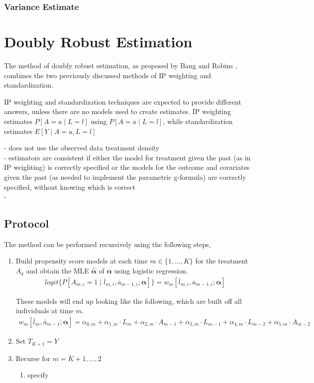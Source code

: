 \subsubsection{Variance Estimate} 




\section{Doubly Robust Estimation} 
The method of doubly robust estimation, as proposed by Bang and Robins \cite{bang2005doubly}, combines the two previously discussed methods of IP weighting and standardization.  

IP weighting and standardization techniques are expected to provide different answers, unless there are no models used to create estimates.\cite{hernan_robins_2016}  
IP weighting estimates $P[A=a \mid L =l]$ using $P[A =a \mid L= l]$, while standardization estimates $E[Y \mid A = a, L=l]$  

- does not use the observed data treatment density \\
- estimators are consistent if either the model for treatment given the past (as in IP weighting) is correctly specified or the models for the outcome and covariates given the past (as needed to implement the parametric g-formula) are correctly specified, without knowing which is correct\\
- 

\subsection{Protocol} 
The method can be performed recursively using the following steps, 

\begin{enumerate}
\item Build propensity score models at each time $m \in \{1, \dots, K \}$ for the treatment $A_k$ and obtain the MLE $\hat{\mathbf{\alpha}}$ of $\mathbf{\alpha}$ using logistic regression. 
\begin{align} 
logit\{P[A_{m,i} = 1 \mid \overline{l}_{m,i}, \overline{a}_{m-1,i}; \mathbf{\alpha}]\} = w_m [\overline{l}_{m,i}, \overline{a}_{m-1,i}; \mathbf{\alpha}]
\end{align} 

These models will end up looking like the following, which are built off all individuals at time $m$.  
\begin{align} 
w_m [\overline{l}_{m}, \overline{a}_{m-1}; \mathbf{\alpha}]  = \alpha_{0,m} + \alpha_{1,m} \cdot L_{m} + \alpha_{2,m} \cdot A_{m-1} + \alpha_{3,m} \cdot L_{m-1} + \alpha_{4,m} \cdot L_{m-2} + \alpha_{5,m} \cdot A_{m-2} 
\end{align} 

\item Set $\hat{T}_{K+1} = Y$ 

\item Recurse for $m = K+1, \dots, 2$ 
\begin{enumerate}
\item specify 
\end{enumerate}
\end{enumerate}

